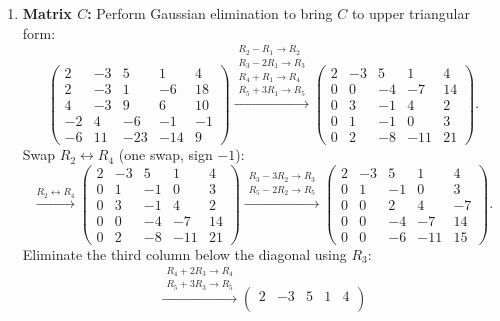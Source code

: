 \begin{exercisesolution*}
\begin{enumerate}[label=\textbf{(\alph*)}]
    \item \textbf{Matrix $C$:}
    Perform Gaussian elimination to bring $C$ to upper triangular form:
    \[
    \begin{pmatrix}
      2 & -3 & 5 & 1 & 4 \\
      2 & -3 & 1 & -6 & 18 \\
      4 & -3 & 9 & 6 & 10 \\
      -2 & 4 & -6 & -1 & -1 \\
      -6 & 11 & -23 & -14 & 9
    \end{pmatrix}
    \xrightarrow{\substack{R_2 - R_1 \to R_2 \\ R_3 - 2R_1 \to R_3 \\ R_4 + R_1 \to R_4 \\ R_5 + 3R_1 \to R_5}}
    \begin{pmatrix}
      2 & -3 & 5 & 1 & 4 \\
      0 & 0 & -4 & -7 & 14 \\
      0 & 3 & -1 & 4 & 2 \\
      0 & 1 & -1 & 0 & 3 \\
      0 & 2 & -8 & -11 & 21
    \end{pmatrix}.
    \]
    Swap $R_2 \leftrightarrow R_4$ (one swap, sign $-1$):
    \[
    \xrightarrow{R_2 \leftrightarrow R_4}
    \begin{pmatrix}
      2 & -3 & 5 & 1 & 4 \\
      0 & 1 & -1 & 0 & 3 \\
      0 & 3 & -1 & 4 & 2 \\
      0 & 0 & -4 & -7 & 14 \\
      0 & 2 & -8 & -11 & 21
    \end{pmatrix}
    \xrightarrow{\substack{R_3 - 3R_2 \to R_3 \\ R_5 - 2R_2 \to R_5}}
    \begin{pmatrix}
      2 & -3 & 5 & 1 & 4 \\
      0 & 1 & -1 & 0 & 3 \\
      0 & 0 & 2 & 4 & -7 \\
      0 & 0 & -4 & -7 & 14 \\
      0 & 0 & -6 & -11 & 15
    \end{pmatrix}.
    \]
    Eliminate the third column below the diagonal using $R_3$:
    \[
    \xrightarrow{\substack{R_4 + 2R_3 \to R_4 \\ R_5 + 3R_3 \to R_5}}
    \begin{pmatrix}
      2 & -3 & 5 & 1 & 4 \\

\end{pmatrix}\]
\end{enumerate}
\end{exercisesolution*}
